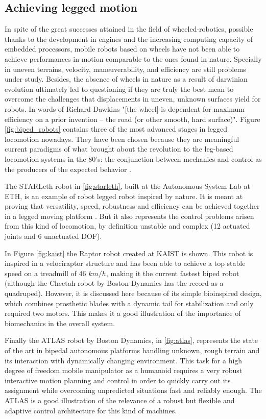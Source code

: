 \subsection{Achieving legged motion} %
\label{sub:legged_motion_in_robotics}
In spite of the great successes attained in the field of wheeled-robotics, possible thanks to the development in engines and the increasing computing capacity of embedded processors, mobile robots based on wheels have not been able to achieve performances in motion comparable to the ones found in nature.
Specially in uneven terrains, velocity, maneuverability, and efficiency are still problems under study.
Besides, the absence of wheels in nature as a result of darwinian evolution ultimately led to questioning \cite{dawkins} if they are truly the best mean to overcome the challenges that displacements in uneven, unknown surfaces yield for robots.
In words of Richard Dawkins \cite{dawkins} "[the wheel] is dependent for maximum efficiency on a prior invention – the road (or other smooth, hard surface)". 
Figure \ref{fig:biped_robots} contains three of the most advanced stages in legged locomotion nowadays.
They have been chosen because they are meaningful current paradigms of what brought about the revolution to the leg-based locomotion systems in the 80's: the conjunction between mechanics and control as the producers of the expected behavior \cite{mit_leg_lab1}.

The STARLeth robot in \ref{fig:starleth}, built at the Autonomous System Lab at ETH, is an example of robot legged robot inspired by nature. 
It is meant at proving that versatility, speed, robustness and efficiency can be achieved together in a legged moving platform \cite{starleth}.
But it also represents the control problems arisen from this kind of locomotion, by definition unstable and complex (12 actuated joints and 6 unactuated DOF). 

In Figure \ref{fig:kaist} the Raptor robot created at KAIST is shown.
This robot is inspired in a velociraptor structure and has been able to achieve a top stable speed on a treadmill of 46 $km/h$, making it the current fastest biped robot (although the Cheetah robot by Boston Dynamics has the record as a quadruped).
However, it is discussed here because of its simple bioinspired design, which combines prosthetic blades with a dynamic tail for stabilization and only required two motors.
This makes it a good illustration of the importance of biomechanics in the overall system.

Finally the ATLAS robot by Boston Dynamics, in \ref{fig:atlas}, represents the state of the art in bipedal autonomous platforms handling unknown, rough terrain and its interaction with dynamically changing environment.
This task for a high degree of freedom mobile manipulator as a humanoid requires a very robust interactive motion planning and control in order to quickly carry out its assignment while overcoming unpredicted situations fast and reliably enough.
The ATLAS is a good illustration of the relevance of a robust but flexible and adaptive control architecture for this kind of machines.


